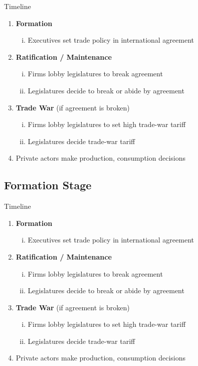 \documentclass[handout]{beamer}
\begin{document}
\begin{frame}{Timeline}
\begin{enumerate}
	\item {\color{gray} \textbf{Formation}}
		\begin{enumerate}[i.]
			\item {\color{gray} Executives set trade policy in international agreement}
		\end{enumerate}
	\item \textbf{Ratification / Maintenance}
		\begin{enumerate}[i.]
			\item Firms lobby legislatures to break agreement
			\item {\color{gray} Legislatures decide to break or abide by agreement}
		\end{enumerate}
	\item {\color{gray} \textbf{Trade War} (if agreement is broken)}
		\begin{enumerate}[i.]
			\item {\color{gray} Firms lobby legislatures to set high trade-war tariff}
			\item {\color{gray} Legislatures decide trade-war tariff}
		\end{enumerate}
	\item {\color{gray} Private actors make production, consumption decisions}
\end{enumerate}
\end{frame}



\subsection{Formation Stage}
\begin{frame}{Timeline}
\begin{enumerate}
	\item \textbf{Formation}
		\begin{enumerate}[i.]
			\item Executives set trade policy in international agreement
		\end{enumerate}
	\item {\color{gray} \textbf{Ratification / Maintenance}}
		\begin{enumerate}[i.]
			\item {\color{gray} Firms lobby legislatures to break agreement}
			\item {\color{gray} Legislatures decide to break or abide by agreement}
		\end{enumerate}
	\item {\color{gray} \textbf{Trade War} (if agreement is broken)}
		\begin{enumerate}[i.]
			\item {\color{gray} Firms lobby legislatures to set high trade-war tariff}
			\item {\color{gray} Legislatures decide trade-war tariff}
		\end{enumerate}
	\item {\color{gray} Private actors make production, consumption decisions}
\end{enumerate}
\end{frame}
\end{document}
